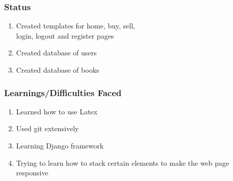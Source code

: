 \documentclass[14pt]{beamer}
\begin{document}
\begin{frame}
    \frametitle{Status}
    \begin{enumerate}
        \item<1-> Created templates for home, buy, sell,\\login, logout and register pages
        \item<2-> Created database of users
        \item<3-> Created database of books
    \end{enumerate}
\end{frame}

\begin{frame}
    \frametitle{Learnings/Difficulties Faced}
    \begin{enumerate}
        \item<1-> Learned how to use Latex
        \item<2-> Used git extensively
        \item<3-> Learning Django framework
        \item<4-> Trying to learn how to stack certain elements to make the web page responsive
    \end{enumerate}
\end{frame}
\end{document}
